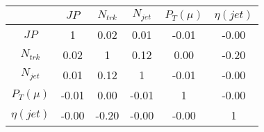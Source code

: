 \begin{tabular}{|c|c|c|c|c|c|} 
\hline
 & $JP$ & $N_{trk}$ & $N_{jet}$ & $P_{T} (\mu)$ & $\eta (jet)$ \\ \hline
$JP$ & 1 & 0.02 & 0.01 & -0.01 & -0.00 \\
$N_{trk}$ & 0.02 & 1 & 0.12 & 0.00 & -0.20 \\
$N_{jet}$ & 0.01 & 0.12 & 1 & -0.01 & -0.00 \\
$P_{T} (\mu)$ & -0.01 & 0.00 & -0.01 & 1 & -0.00 \\
$\eta (jet)$ & -0.00 & -0.20 & -0.00 & -0.00 & 1 \\
\hline 
\end{tabular} 



